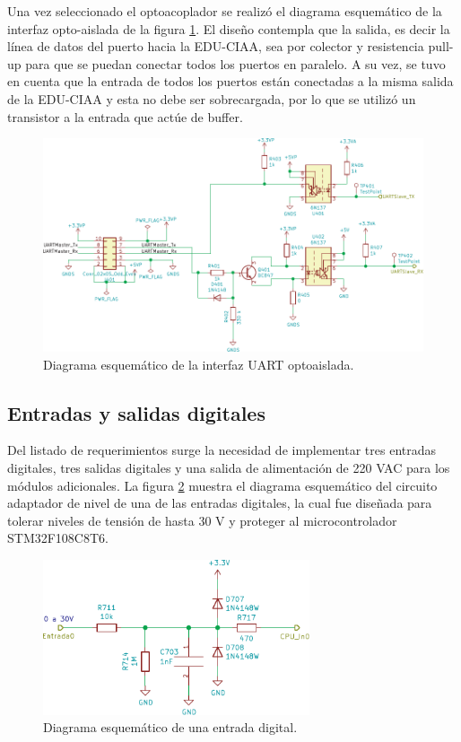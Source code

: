 Una vez seleccionado el optoacoplador se realizó el diagrama esquemático de la interfaz opto-aislada de la figura \ref{fig:InterfazOpto}. El diseño contempla que la salida, es decir la línea de datos del puerto hacia la EDU-CIAA, sea por colector y resistencia pull-up para que se puedan conectar todos los puertos en paralelo. A su vez, se tuvo en cuenta que la entrada de todos los puertos están conectadas a la misma salida de la EDU-CIAA y esta no debe ser sobrecargada, por lo que se utilizó un transistor a la entrada que actúe de buffer.

\begin{figure}[H]
	\centering
	\includegraphics[width=1\textwidth]{./Figures/InterfazOpto.pdf}
	\caption{Diagrama esquemático de la interfaz UART optoaislada.}
	\label{fig:InterfazOpto}
\end{figure}

\clearpage
\subsection{Entradas y salidas digitales}

Del listado de requerimientos surge la necesidad de implementar tres entradas digitales, tres salidas digitales y una salida de alimentación de 220 VAC para los módulos adicionales. La figura \ref{fig:EntradaDigital} muestra el diagrama esquemático del circuito adaptador de nivel de una de las entradas digitales, la cual fue diseñada para tolerar niveles de tensión de hasta 30 V y proteger al microcontrolador STM32F108C8T6.

\begin{figure}[H]
	\centering
	\includegraphics[width=0.7\textwidth]{./Figures/EntradaDigital.pdf}
	\caption{Diagrama esquemático de una entrada digital.}
	\label{fig:EntradaDigital}
\end{figure}

